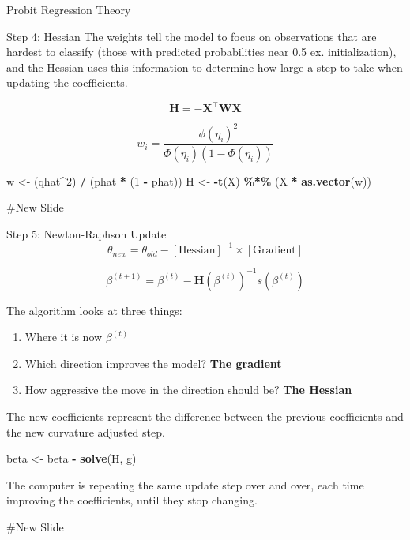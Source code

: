 \documentclass[
  ignorenonframetext,
]{beamer}
\newenvironment{Shaded}{\begin{snugshade}}{\end{snugshade}}
\newcommand{\DecValTok}[1]{\textcolor[rgb]{0.00,0.00,0.81}{#1}}
\newcommand{\FunctionTok}[1]{\textcolor[rgb]{0.13,0.29,0.53}{\textbf{#1}}}
\newcommand{\NormalTok}[1]{#1}
\newcommand{\OtherTok}[1]{\textcolor[rgb]{0.56,0.35,0.01}{#1}}
\newcommand{\SpecialCharTok}[1]{\textcolor[rgb]{0.81,0.36,0.00}{\textbf{#1}}}
\providecommand{\tightlist}{%
  \setlength{\itemsep}{0pt}\setlength{\parskip}{0pt}}
\begin{document}
\begin{frame}[fragile]{Probit Regression Theory}
\begin{block}{Step 4: Hessian}
\protect{}\label{step-4-hessian}
The weights tell the model to focus on observations that are hardest to
classify (those with predicted probabilities near 0.5 ex.
initialization), and the Hessian uses this information to determine how
large a step to take when updating the coefficients.

\[
\mathbf{H} = -\mathbf{X}^\top \mathbf{W} \mathbf{X}
\]

\[
w_i = \frac{\phi(\eta_i)^2}{\Phi(\eta_i)(1 - \Phi(\eta_i))}
\]

\begin{Shaded}
\begin{Highlighting}[]
\NormalTok{w }\OtherTok{\textless{}{-}}\NormalTok{ (qhat}\SpecialCharTok{\^{}}\DecValTok{2}\NormalTok{) }\SpecialCharTok{/}\NormalTok{ (phat }\SpecialCharTok{*}\NormalTok{ (}\DecValTok{1} \SpecialCharTok{{-}}\NormalTok{ phat))}
\NormalTok{H }\OtherTok{\textless{}{-}} \SpecialCharTok{{-}}\FunctionTok{t}\NormalTok{(X) }\SpecialCharTok{\%*\%}\NormalTok{ (X }\SpecialCharTok{*} \FunctionTok{as.vector}\NormalTok{(w))}
\end{Highlighting}
\end{Shaded}

\#New Slide
\end{block}

\begin{block}{Step 5: Newton-Raphson Update}
\protect{}\label{step-5-newton-raphson-update}
\[
\theta_{new} = \theta_{old} - [\text{Hessian}]^{-1} \times [\text{Gradient}]
\]

\[
\beta^{(t+1)} = \beta^{(t)} - \mathbf{H}(\beta^{(t)})^{-1} s(\beta^{(t)})
\]

The algorithm looks at three things:

\begin{enumerate}
\tightlist
\item
  Where it is now \(\beta^{(t)}\)
\item
  Which direction improves the model? \textbf{The gradient}
\item
  How aggressive the move in the direction should be? \textbf{The
  Hessian}
\end{enumerate}

The new coefficients represent the difference between the previous
coefficients and the new curvature adjusted step.

\begin{Shaded}
\begin{Highlighting}[]
\NormalTok{beta }\OtherTok{\textless{}{-}}\NormalTok{ beta }\SpecialCharTok{{-}} \FunctionTok{solve}\NormalTok{(H, g)}
\end{Highlighting}
\end{Shaded}

The computer is repeating the same update step over and over, each time
improving the coefficients, until they stop changing.

\#New Slide
\end{block}
\end{frame}
\end{document}
